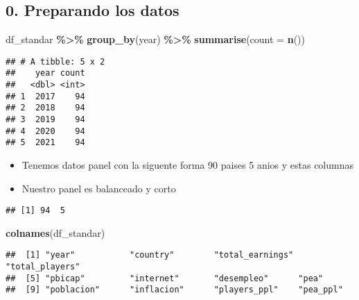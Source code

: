 \documentclass[
]{article}
\newenvironment{Shaded}{\begin{snugshade}}{\end{snugshade}}
\newcommand{\AttributeTok}[1]{\textcolor[rgb]{0.13,0.29,0.53}{#1}}
\newcommand{\FunctionTok}[1]{\textcolor[rgb]{0.13,0.29,0.53}{\textbf{#1}}}
\newcommand{\NormalTok}[1]{#1}
\newcommand{\SpecialCharTok}[1]{\textcolor[rgb]{0.81,0.36,0.00}{\textbf{#1}}}
\providecommand{\tightlist}{%
  \setlength{\itemsep}{0pt}\setlength{\parskip}{0pt}}
\begin{document}
\subsection{0. Preparando los datos}\label{preparando-los-datos}

\begin{Shaded}
\begin{Highlighting}[]
\NormalTok{df\_standar }\SpecialCharTok{\%\textgreater{}\%} 
  \FunctionTok{group\_by}\NormalTok{(year) }\SpecialCharTok{\%\textgreater{}\%} 
  \FunctionTok{summarise}\NormalTok{(}\AttributeTok{count =} \FunctionTok{n}\NormalTok{())}
\end{Highlighting}
\end{Shaded}

\begin{verbatim}
## # A tibble: 5 x 2
##    year count
##   <dbl> <int>
## 1  2017    94
## 2  2018    94
## 3  2019    94
## 4  2020    94
## 5  2021    94
\end{verbatim}

\begin{itemize}
\tightlist
\item
  Tenemos datos panel con la siguente forma 90 paises 5 anios y estas
  columnas
\item
  Nuestro panel es balanceado y corto
\end{itemize}

\begin{Shaded}
\end{Shaded}

\begin{verbatim}
## [1] 94  5
\end{verbatim}

\begin{Shaded}
\begin{Highlighting}[]
\FunctionTok{colnames}\NormalTok{(df\_standar)}
\end{Highlighting}
\end{Shaded}

\begin{verbatim}
##  [1] "year"           "country"        "total_earnings" "total_players" 
##  [5] "pbicap"         "internet"       "desempleo"      "pea"           
##  [9] "poblacion"      "inflacion"      "players_ppl"    "pea_ppl"
\end{verbatim}
\end{document}

